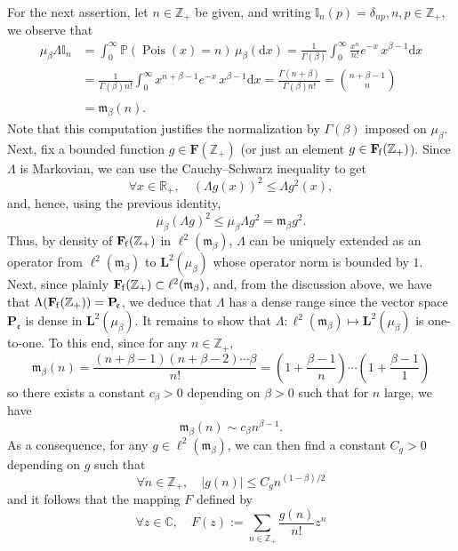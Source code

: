 \documentclass[AHL,Unicode,longabstracts]{cedram}
\DeclareMathOperator{\Pois}{Pois}
\newcommand{\df}{\mathrel{:=}}
\newcommand{\CC}{\mathbb{C}}
\newcommand{\PP}{\mathbb{P}}
\newcommand{\RR}{\mathbb{R}}
\newcommand{\ZZ}{\mathbb{Z}}
\newcommand{\fe}{\mathfrak{e}}
\newcommand{\fm}{\mathfrak{m}}
\newcommand{\iy}{\infty}
\newcommand{\lt}{\left}
\newcommand{\rt}{\right}
\newcommand{\lve}{\lt\vert}
\newcommand{\rve}{\rt\vert}
\newcommand{\esP}{\mathbf{P}}
\newcommand{\esL}{\mathbf{L}}
\newcommand{\esLd}{\ell}
\newcommand{\esF}{\mathbf{F}}
\newcommand{\esPe}{\esP_{\! \fe}}
\newcommand{\esFf}{\esF_{\hskip-.3mm\mathrm{f}}}
\let\oldforall\forall
\renewcommand*{\forall}{\mathrel{\oldforall}}
\newcommand*{\dd}{\mathrm{d}}
\newcommand*{\dx}{\dd x}
\begin{document}
For the next assertion, let $n\in\ZZ_+$ be given, and writing $\mathbb{I}_n(p)=\delta_{np}, n,p\in \ZZ_+,$ we observe that
\begin{align*}
\mu_{\beta}\Lambda \mathbb{I}_n&=\int_0^{\iy } \PP(\Pois(x)=n)\, \mu_{\beta}(\dx) =\frac1{\Gamma(\beta)}\int_0^{\iy } \frac{x^n}{n!}e^{-x} \, x^{\beta-1} \dx\\
&=\frac1{\Gamma(\beta)n!}\int_0^{\iy } x^{n+\beta-1}e^{-x} \, x^{\beta-1} \dx =\frac{\Gamma(n+\beta)}{\Gamma(\beta)n!} =\binom{n+\beta-1}{n}\\
&=\fm_{\beta}(n).\phantom{\int^l}
\end{align*}
Note that this computation justifies the normalization by $\Gamma(\beta)$ imposed on $\mu_{\beta}$. Next, fix a bounded function $g\in\esF(\ZZ_+)$ (or just an element $g\in\esFf(\ZZ_+)$). Since $\Lambda$ is Markovian, we can use the Cauchy--Schwarz inequality to get
\begin{equation}\label{csL}
\forall x\in\RR_+,\quad (\Lambda g(x))^2\leq \Lambda g^2(x),
\end{equation}
and, hence, using the previous identity,
\[
\mu_{\beta} (\Lambda g)^2\leq \mu_{\beta}\Lambda g^2 =\fm_{\beta} g^2.
\]
Thus, by density of $\esFf(\ZZ_+)$ in $\esLd^2(\fm_{\beta})$, $\Lambda$ can be uniquely extended as an operator from $\esLd^2(\fm_{\beta})$ to $\esL^2(\mu_{\beta})$ whose operator norm is bounded by $1$. Next, since plainly $\esFf(\ZZ_+) \subset \esLd^2(\fm_{\beta})$, and, from the discussion above, we have that $\Lambda (\esFf(\ZZ_+))=\esPe$, we deduce that $\Lambda$ has a dense range since the vector space $\esPe$ is dense in $\esL^2(\mu_{\beta})$. It remains to show that $\Lambda : \esLd^2(\fm_{\beta}) \mapsto \esL^2(\mu_{\beta})$ is one-to-one. To this end, since for any $n\in \ZZ_+,$
\begin{equation}\label{mbetan}
\fm_{\beta}(n)= \frac{(n+\beta-1)(n+\beta-2)\cdots \beta}{n!} =\lt(1+\frac{\beta-1}{n}\rt)\cdots \lt(1+\frac{\beta-1}{1}\rt)
\end{equation}
so there exists a constant $c_{\beta}>0$ depending on $\beta>0$ such that for $n$ large, we have
\[
\fm_{\beta}(n)\sim c_{\beta}n^{\beta-1}.
\]
As a consequence, for any $g\in\esLd^2(\fm_{\beta})$, we can then find a constant $C_g>0$ depending on $g$ such that
\[
\forall n\in\ZZ_+,\quad \lve g(n)\rve\leq C_g n^{(1-\beta)/2}
\]
and it follows that the mapping $F$ defined by
\begin{equation}\label{boundf}
\forall z\in \CC,\quad F(z)\df \sum_{n\in\ZZ_+} \frac{g(n)}{n!}z^n
\end{equation}
\end{document}
